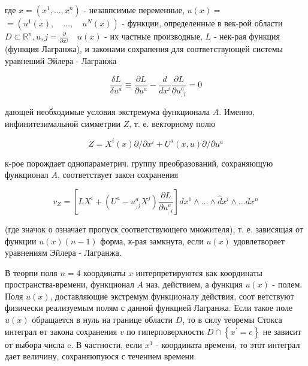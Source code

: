\documentclass[10pt]{article}
\begin{document}
где $x=\left(x^{1}, \ldots, x^{n}\right)$ - незавпсимые переменные, $u(x)=$ $=\left(u^{1}(x), \quad \ldots, \quad u^{N}(x)\right)$ - функции, определенные в век-рой области $D \subset \mathbb{R}^{n}, u, j=\frac{\partial}{\partial x^{j}} \quad u(x)$ - их частные производные, $L$ - нек-рая функция (функция Лагранжа), и законами сохрапения для соответствующей системы уравнеший Эйлера - Лагранжа



\[

\frac{\delta L}{\delta u^{a}} \equiv \frac{\partial L}{\partial u^{a}}-\frac{d}{d x^{i}} \frac{\partial L}{\partial u_{, i}^{a}}=0

\]



дающей необходимые условия экстремума функционала $A$. Именно, инфинитезимальной симметрии $Z$, т. е. векторному полю



\[

Z=X^{i}(x) \partial / \partial x^{i}+U^{a}(x, u) \partial / \partial u^{a}

\]



к-рое порождает однопараметрич. группу преобразований, сохраняющую функционал $A$, соответствует закон сохранения



\[

v_{Z}=\left[L X^{i}+\left(U^{a}-u_{, j}^{a} X^{j}\right) \frac{\partial L}{\partial u_{, i}^{a}}\right] d x^{1} \wedge \ldots \wedge \hat{d} x^{i} \wedge \ldots d x^{n}

\]



(где значок о означает пропуск соответствующего множителя), т. е. зависящая от функции $u(x)(n-1)$ форма, к-рая замкнута, если $u(x)$ удовлетворяет уравнениям Эйлера - Лагранжа.



В теорпи поля $n=4$ координаты $x$ интерпретируются как координаты пространства-времени, функционал $A$ наз. действием, а функция $u(x)$ - полем. Поля $u(x)$, доставляющие экстремум функционалу действия, соот ветствуют физически реализуемым полям с данной функцией Лагранжа. Если такое поле $u(x)$ обращается в нуль на границе области $D$, то в силу теоремы Стокса интеграл өт закона сохранения $v$ по гиперповерхности $D \cap\left\{x^{\prime}=c\right\}$ не зависит от выбора числа c. В частности, если $x^{1}$ - координата времени, то этот интеграл дает величину, сохраняюпуюся с течением времени.
\end{document}
